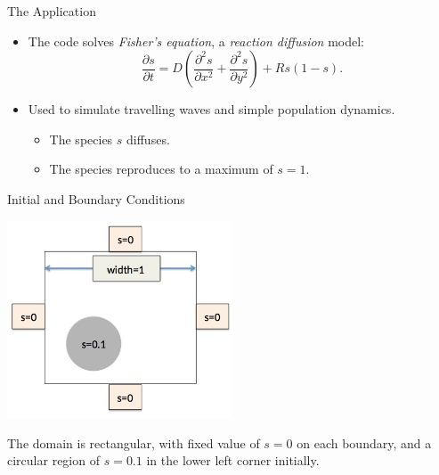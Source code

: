 \documentclass[aspectratio=43]{beamer}
\begin{document}
\begin{frame}[fragile]{The Application}
    \begin{itemize}
        \item The code solves \emph{Fisher's equation}, a \emph{reaction diffusion} model:
        \begin{equation*}
            \frac{\partial s}{\partial t} = D\left( \frac{\partial ^2s}{\partial x^2} + \frac{\partial ^2s}{\partial y^2} \right) + Rs(1-s).
        \end{equation*}
        \item Used to simulate travelling waves and simple  population dynamics.
        \begin{itemize}
            \item The species $s$ diffuses.
            \item The species reproduces to a maximum of $s=1$.
        \end{itemize}
    \end{itemize}
\end{frame}

\begin{frame}[fragile]{Initial and Boundary Conditions}
    \begin{center}
        \includegraphics[width=0.5\textwidth]{./images/ic_bc.jpg}
    \end{center}
    The domain is rectangular, with fixed value of $s=0$ on  each boundary, and a circular region of $s=0.1$ in the
    lower left corner initially.
\end{frame}
\end{document}
